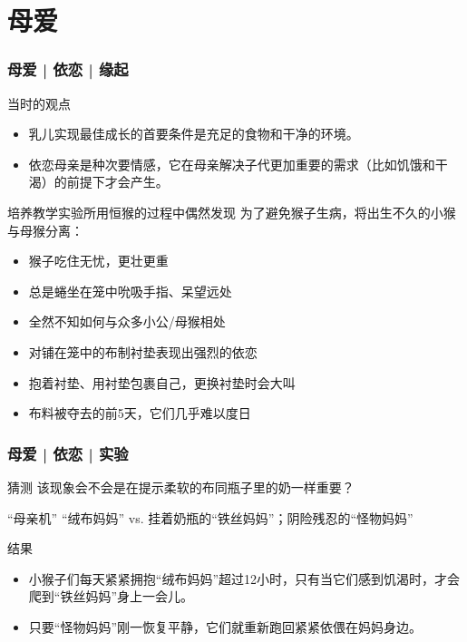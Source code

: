 \section{母爱}
\begin{frame}
  \frametitle{母爱 | 依恋 | 缘起}
  \begin{block}{当时的观点}
    \begin{itemize}
      \item 乳儿实现最佳成长的首要条件是充足的食物和干净的环境。
      \item 依恋母亲是种次要情感，它在母亲解决子代更加重要的需求（比如饥饿和干渴）的前提下才会产生。
    \end{itemize}
  \end{block}
  \pause
  \begin{block}{培养教学实验所用恒猴的过程中偶然发现}
    为了避免猴子生病，将出生不久的小猴与母猴分离：
    \begin{itemize}
      \item 猴子吃住无忧，更壮更重
      \item 总是蜷坐在笼中吮吸手指、呆望远处
      \item 全然不知如何与众多小公/母猴相处
      \item 对铺在笼中的布制衬垫表现出强烈的依恋
      \item 抱着衬垫、用衬垫包裹自己，更换衬垫时会大叫
      \item 布料被夺去的前5天，它们几乎难以度日
    \end{itemize}
  \end{block}
\end{frame}

\begin{frame}
  \frametitle{母爱 | 依恋 | 实验}
  \begin{block}{猜测}
    该现象会不会是在提示柔软的布同瓶子里的奶一样重要？
  \end{block}
  \vspace{-0.5em}
  \pause
  \begin{block}{“母亲机”}
      “绒布妈妈” vs. 挂着奶瓶的“铁丝妈妈”；阴险残忍的“怪物妈妈”
  \end{block}
  \vspace{-0.5em}
  \pause
  \begin{block}{结果}
    \begin{itemize}
      \item 小猴子们每天紧紧拥抱“绒布妈妈”超过12小时，只有当它们感到饥渴时，才会爬到“铁丝妈妈”身上一会儿。
      \item 只要“怪物妈妈”刚一恢复平静，它们就重新跑回紧紧依偎在妈妈身边。
    \end{itemize}
    \vspace{-2.8em}
    \begin{figure}
      \centering
      \qquad
    \end{figure}
  \end{block}
\end{frame}

